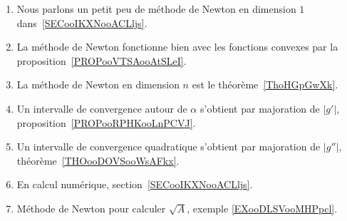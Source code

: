 
\begin{enumerate}
	\item
	      Nous parlons un petit peu de méthode de Newton en dimension \( 1\) dans~\ref{SECooIKXNooACLljs}.
	\item
	      La méthode de Newton fonctionne bien avec les fonctions convexes par la proposition~\ref{PROPooVTSAooAtSLeI}.
	\item
	      La méthode de Newton en dimension \( n\) est le théorème~\ref{ThoHGpGwXk}.
	\item
	      Un intervalle de convergence autour de \( \alpha\) s'obtient par majoration de \( | g' |\), proposition~\ref{PROPooRPHKooLnPCVJ}.
	\item
	      Un intervalle de convergence quadratique s'obtient par majoration de \( | g'' |\), théorème~\ref{THOooDOVSooWsAFkx}.
	\item
	      En calcul numérique, section~\ref{SECooIKXNooACLljs}.
	\item
	      Méthode de Newton pour calculer \( \sqrt{ A }\), exemple \ref{EXooDLSVooMHPpcl}.
\end{enumerate}

